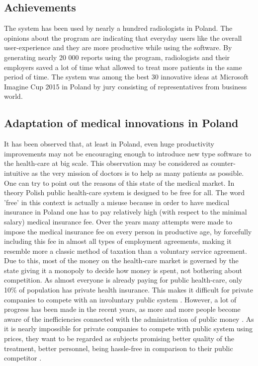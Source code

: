 \documentclass[12pt, twoside, openany]{report}
\theoremstyle{definition}
\begin{document}
\subsection{Achievements}
The system has been used by nearly a hundred radiologists in Poland. The opinions about the program are indicating that everyday users like the overall user-experience and they are more productive while using the software. 
By generating nearly 20 000 reports using the program, radiologists and their employers saved a lot of time what allowed to treat more patients in the same period of time.
The system was among the best 30 innovative ideas at Microsoft Imagine Cup 2015 in Poland by jury consisting of representatives from business world. 


\subsection{Adaptation of medical innovations in Poland}
It has been observed that, at least in Poland, even huge productivity improvements may not be encouraging enough to introduce new type software to the health-care at big scale. This observation may be considered as counter-intuitive as the very mission of doctors is to help as many patients as possible. One can try to point out the reasons of this state of the medical market. 	
In theory Polish public health-care system is designed to be free for all. The word 'free' in this context is actually a misuse because in order to have medical insurance in Poland one has to pay relatively high (with respect to the minimal salary) medical insurance fee. Over the years many attempts were made to impose the medical insurance fee on every person in  productive age, by forcefully including this fee in almost all types of employment agreements, making it resemble more a classic method of taxation than a voluntary service agreement. Due to this, most of the money on the health-care market is governed by the state giving it a monopoly to decide how money is spent, not bothering about competition. As almost everyone is already paying for public health-care, only 10\% of population has private health insurance. This makes it difficult for private companies to compete with an involuntary public system \cite{nfz}. However, a lot of progress has been made in the recent years, as more and more people become aware of the inefficiencies connected with the administration of public money \cite{inefficient}. As it is nearly impossible for private companies to compete with public system using prices, they want to be regarded as subjects promising better quality of the treatment, better personnel, being hassle-free in comparison to their public competitor \cite{private-better}. 
\end{document}
